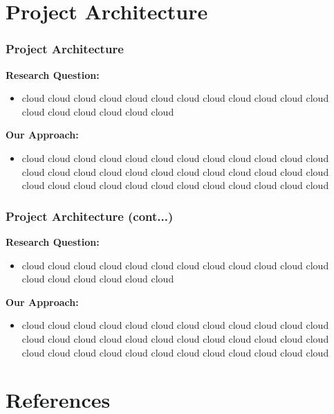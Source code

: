 \documentclass{beamer}
\begin{document}
\section{Project Architecture}
\begin{frame}
\frametitle{Project Architecture}
\textbf{Research Question:}
\begin{itemize}
  \item cloud cloud cloud cloud cloud cloud cloud cloud cloud cloud cloud cloud cloud cloud cloud cloud cloud cloud
\end{itemize}

\textbf{Our Approach:}
\begin{itemize}
  \item cloud cloud cloud cloud cloud cloud cloud cloud cloud cloud cloud cloud cloud cloud cloud cloud cloud cloud cloud cloud cloud cloud cloud cloud cloud cloud cloud cloud cloud cloud cloud cloud cloud cloud cloud cloud
\end{itemize}
\end{frame}

\begin{frame}
\frametitle{Project Architecture (cont...)}
\textbf{Research Question:}
\begin{itemize}
  \item cloud cloud cloud cloud cloud cloud cloud cloud cloud cloud cloud cloud cloud cloud cloud cloud cloud cloud
\end{itemize}

\textbf{Our Approach:}
\begin{itemize}
  \item cloud cloud cloud cloud cloud cloud cloud cloud cloud cloud cloud cloud cloud cloud cloud cloud cloud cloud cloud cloud cloud cloud cloud cloud cloud cloud cloud cloud cloud cloud cloud cloud cloud cloud cloud cloud
\end{itemize}
\end{frame}

\section{References}
\begin{frame}
\printbibliography[heading=none] 
\end{frame}
\end{document}
